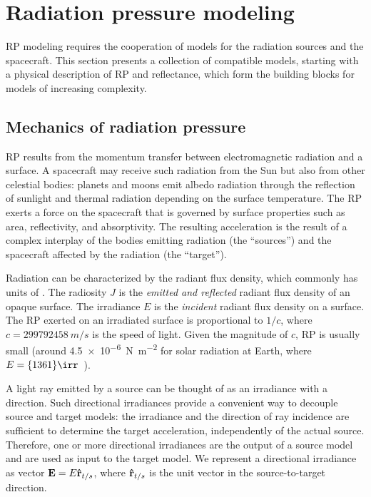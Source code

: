 \section{Radiation pressure modeling}

\gls{RP} modeling requires the cooperation of models for the radiation sources and the spacecraft. This section presents a collection of compatible models, starting with a physical description of \gls{RP} and reflectance, which form the building blocks for models of increasing complexity.

\subsection{Mechanics of radiation pressure}
\label{subsec:general-rp-mechanics}

\gls{RP} results from the momentum transfer between electromagnetic radiation and a surface. A spacecraft may receive such radiation from the Sun but also from other celestial bodies: planets and moons emit albedo radiation through the reflection of sunlight and thermal radiation depending on the surface temperature. The \gls{RP} exerts a force on the spacecraft that is governed by surface properties such as area, reflectivity, and absorptivity. The resulting acceleration is the result of a complex interplay of the bodies emitting radiation (the ``sources'') and the spacecraft affected by the radiation (the ``target'').

Radiation can be characterized by the radiant flux density, which commonly has units of \unit{\irr}. The radiosity $J$ is the \emph{emitted and reflected} radiant flux density of an opaque surface. The irradiance $E$ is the \emph{incident} radiant flux density on a surface. The \gls{RP} exerted on an irradiated surface is proportional to $1/c$, where $c = \qty{299792458}{m/s}$ is the speed of light. Given the magnitude of $c$, \gls{RP} is usually small (around \qty{4.5e-6}{\N\per\m\squared} for solar radiation at Earth, where $E=\qty{1361}{\irr}$~\cite{Kopp2011}).

A light ray emitted by a source can be thought of as an irradiance with a direction. Such directional irradiances provide a convenient way to decouple source and target models: the irradiance and the direction of ray incidence are sufficient to determine the target acceleration, independently of the actual source. Therefore, one or more directional irradiances are the output of a source model and are used as input to the target model. We represent a directional irradiance as vector $\vb E = E \vu r_{t/s}$, where $\vu r_{t/s}$ is the unit vector in the source-to-target direction.

